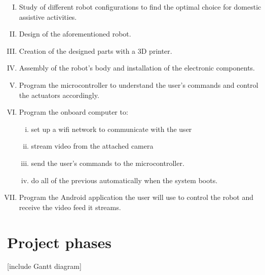 	\begin{enumerate}[I.]

		\item Study of different robot configurations to find the optimal choice for domestic assistive activities.\\

		\item Design of the aforementioned robot.\\

		\item Creation of the designed parts with a 3D printer.\\

		\item Assembly of the robot's body and installation of the electronic components.\\

		\item Program the microcontroller to understand the user's commands and control the actuators accordingly.\\

		\item Program the onboard computer to: 
			\begin{enumerate}[i.] 
			\item set up a wifi network to communicate with the user
			\item stream video from the attached camera 
			\item send the user's commands to the microcontroller.
			\item do all of the previous automatically when the system boots.\\
			\end{enumerate}

	
		\item Program the Android application the user will use to control the robot and receive the video feed it streams.

	\end{enumerate}


\section{Project phases}
[include Gantt diagram]




